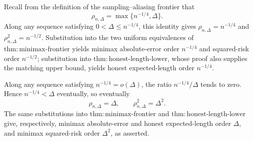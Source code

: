 Recall from the definition of the sampling--aliasing frontier that
\[
 \rho_{n,\Delta}=\max\{n^{-1/4},\Delta\}.
\]
Along any sequence satisfying \(0<\Delta\le n^{-1/4}\), this identity gives \(\rho_{n,\Delta}=n^{-1/4}\) and \(\rho_{n,\Delta}^2=n^{-1/2}\).  Substitution into the two uniform equivalences of \(\mathrm{thm:minimax\text{-}frontier}\) yields minimax absolute-error order \(n^{-1/4}\) and squared-risk order \(n^{-1/2}\); substitution into \(\mathrm{thm:honest\text{-}length\text{-}lower}\), whose proof also supplies the matching upper bound, yields honest expected-length order \(n^{-1/4}\).

Along any sequence satisfying \(n^{-1/4}=o(\Delta)\), the ratio \(n^{-1/4}/\Delta\) tends to zero.  Hence \(n^{-1/4}<\Delta\) eventually, so eventually
\[
 \rho_{n,\Delta}=\Delta,
 \qquad
 \rho_{n,\Delta}^2=\Delta^2.
\]
The same substitutions into \(\mathrm{thm:minimax\text{-}frontier}\) and \(\mathrm{thm:honest\text{-}length\text{-}lower}\) give, respectively, minimax absolute-error and honest expected-length order \(\Delta\), and minimax squared-risk order \(\Delta^2\), as asserted.